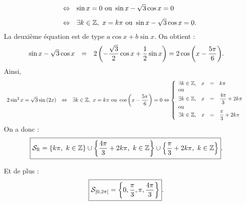 \documentclass[a4paper, 11pt]{article}
\begin{document}
\begin{correction}
\begin{enumerate}
$$\begin{array}{lll}
&\Leftrightarrow & \sin{x}=0\ \hbox{ou}\ \sin{x}-\sqrt{3}\cos{x}=0\vsec\\
&\Leftrightarrow & \exists k\in\Z,\  x=k\pi \ \hbox{ou}\ \sin{x}-\sqrt{3}\cos{x}=0.
\end{array}$$
La deuxi\`eme \'equation est de type $a\cos{x}+b\sin{x}$. On obtient :
$$\begin{array}{lll}
\sin{x}-\sqrt{3}\cos{x}&=&2\left( -\displaystyle\frac{\sqrt{3}}{2}\cos{x}+\frac{1}{2}\sin{x}   \right)
= 2\cos{\left(x-\displaystyle\frac{5\pi}{6}\right)}.
\end{array}$$
Ainsi,
$$\begin{array}{lll}
2\sin^2{x}=\sqrt{3}\sin{(2x)}& \Leftrightarrow& \exists k\in\mathbb{Z},\  x=k\pi \ \hbox{ou}\ \cos{\left(x-\displaystyle\frac{5\pi}{6}\right)}=0
\Leftrightarrow \left\lbrace \begin{array}{llll}
\exists k\in\mathbb{Z},&  x&=&k\pi\\
\hbox{ou}\\
\exists k\in\mathbb{Z},&  x&=&\displaystyle\frac{4\pi}{3}+2k\pi\\
\hbox{ou}\\
\exists k\in\mathbb{Z},& x&=&\displaystyle\frac{\pi}{3}+2k\pi\\
\end{array}\right.
\end{array}$$
On a donc :
$$\fbox{$\mathcal{S}_{\R}=\left\lbrace k\pi,\ k\in\Z  \right\rbrace\cup \left\lbrace \ddp\frac{4\pi}{3}+2k\pi,\ k\in\Z  \right\rbrace\cup \left\lbrace \ddp\frac{\pi}{3}+2k\pi,\ k\in\Z  \right\rbrace$}.$$
\begin{minipage}[c]{0.45\textwidth}
Et de plus :
$$\fbox{$\mathcal{S}_{\lbrack 0,2\pi\lbrack}=\left\lbrace 0,\displaystyle\frac{\pi}{3},\pi,\displaystyle\frac{4\pi}{3} \right\rbrace$}.$$
\end{minipage}
\quad \begin{minipage}[c]{0.45\textwidth}
\begin{center}

\end{center}
\end{minipage}
\end{enumerate}
\end{correction}
\end{document}
